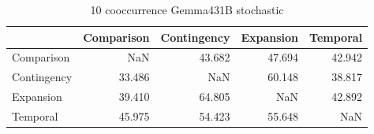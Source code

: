 \begin{table}
\caption{10 cooccurrence Gemma431B stochastic}
\begin{tabular}{lrrrr}
\toprule
 & Comparison & Contingency & Expansion & Temporal \\
\midrule
Comparison & NaN & 43.682 & 47.694 & 42.942 \\
Contingency & 33.486 & NaN & 60.148 & 38.817 \\
Expansion & 39.410 & 64.805 & NaN & 42.892 \\
Temporal & 45.975 & 54.423 & 55.648 & NaN \\
\bottomrule
\end{tabular}
\end{table}
